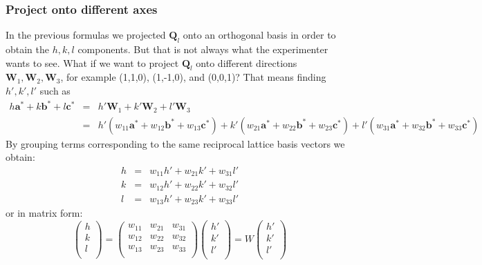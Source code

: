 \documentclass[prb]{revtex4}%
\begin{document}
\subsubsection{Project onto different axes}
In the previous formulas we projected $\textbf{Q}_l$ onto an orthogonal basis in order to obtain the $h, k, l$ components.
But that is not always what the experimenter wants to see.
What if we want to project $\textbf{Q}_l$ onto different directions $\textbf{W}_1, \textbf{W}_2, \textbf{W}_3$, for example (1,1,0), (1,-1,0), and (0,0,1)?
That means finding $h', k', l'$ such as
\begin{eqnarray}
  \nonumber h \textbf{a}^* + k \textbf{b}^*+ l \textbf{c}^* &=& h'\textbf{W}_1 + k'\textbf{W}_2 + l'\textbf{W}_3 \\
   &=& h'(w_{11}\textbf{a}^* + w_{12}\textbf{b}^* +w_{13}\textbf{c}^*) + k'(w_{21}\textbf{a}^* + w_{22}\textbf{b}^* +w_{23}\textbf{c}^*) + l'(w_{31}\textbf{a}^* + w_{32}\textbf{b}^* +w_{33}\textbf{c}^*)
\end{eqnarray}
By grouping terms corresponding to the same reciprocal lattice basis vectors we obtain:
\begin{eqnarray}
  h &=& w_{11} h' + w_{21} k' + w_{31} l'\\
  k &=& w_{12} h' + w_{22} k' + w_{32} l' \\
  l &=& w_{13} h' + w_{23} k' + w_{33} l'
\end{eqnarray}
or in matrix form:
\begin{equation}
    \left(
      \begin{array}{c}
        h \\
        k \\
        l \\
      \end{array}
    \right)
    = \left(
        \begin{array}{ccc}
          w_{11} & w_{21} & w_{31} \\
          w_{12} & w_{22} & w_{32} \\
          w_{13} & w_{23} & w_{33} \\
        \end{array}
      \right)
    \left(
      \begin{array}{c}
        h' \\
        k' \\
        l' \\
      \end{array}
    \right) = W\left(
      \begin{array}{c}
        h' \\
        k' \\
        l' \\
      \end{array}
    \right)
\end{equation}
\end{document}
